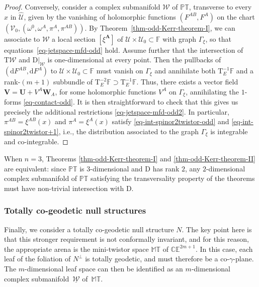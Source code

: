 \documentclass[pdftex]{sigma}
\numberwithin{equation}{section}
\newcommand{\mbf} [1]{\mathbf{#1}}
\newcommand{\mc} [1]{\mathcal{#1}}
\newcommand{\dd} {\mathrm{d}}
\newcommand{\Tgt} {\mathrm{T}}
\newcommand{\PT} {\mathbb{PT}}
\newcommand{\T} {\mathbb{T}}
\newcommand{\E} {\mathbb{E}}
\newcommand{\M} {\mathbb{M}}
\newcommand{\C} {\mathbb{C}}
\newcommand{\F} {\mathbb{F}}
\begin{document}
\begin{proof}
Conversely, consider a complex submanifold $\mc{W}$ of $\PT$, transverse to every $\hat{x}$ in $\widehat{\mc{U}}$, given by the vanishing of holomorphic functions $(F^{AB}, F^A)$ on the chart $(\mc{V}_0,(\omega^0, \omega^A, \pi^A, \pi^{AB}))$. By Theorem~\ref{thm-odd-Kerr-theorem-I}, we can associate to $\mc{W}$ a local section $[\xi^\mbf{A}]$ of $\mc{U} \times \mc{U}_0 \subset \F$ with graph $\Gamma_\xi$, so that equations~\eqref{eq-jetspace-mfd-odd} hold. Assume further that the intersection of $\Tgt \mc{W}$ and $\left. \mathrm{D} \right|_\mc{W}$ is one-dimensional at every point. Then the pullbacks of $( \dd F^{AB} , \dd F^{A} )$ to $\mc{U} \times \mc{U}_0 \subset \F$ must vanish on $\Gamma_\xi$ and annihilate both $\Tgt^{-1}_E \F$ and a rank-$(m+1)$ subbundle of $\Tgt^{-2}_E \F \supset \Tgt^{-1}_E \F$. Thus, there exists a vector f\/ield $\bm{V} = \bm{U} + V^A \bm{W}_A $, for some holomorphic functions $V^A$ on $\Gamma_\xi$, annihilating the $1$-forms \eqref{eq-contact-odd}. It is then straightforward to check that this gives us precisely the additional restrictions \eqref{eq-jetspace-mfd-odd2}. In particular, $\pi^{AB} = \xi^{AB}(x)$ and $\pi^{A} = \xi^A(x)$ satisfy \eqref{eq-int-spinor2twistor-odd} and \eqref{eq-int-spinor2twistor+1}, i.e., the distribution associated to the graph $\Gamma_{\xi}$ is integrable and co-integrable.
\end{proof}

\begin{Remark}\label{rem-fol-1}
When $n=3$, Theorems \ref{thm-odd-Kerr-theorem-I} and \ref{thm-odd-Kerr-theorem-II} are equivalent: since $\PT$ is $3$-dimensional and $\mathrm{D}$ has rank $2$, any $2$-dimensional complex submanifold of $\PT$ satisfying the transversality property of the theorems must have non-trivial intersection with $\mathrm{D}$.
\end{Remark}

\subsubsection{Totally co-geodetic null structures}
Finally, we consider a totally co-geodetic null structure $N$. The key point here is that this stronger requirement is not conformally invariant, and for this reason, the appropriate arena is the mini-twistor space $\M\T$ of $\C \E^{2m+1}$. In this case, each leaf of the foliation of $N^\perp$ is totally geodetic, and must therefore be a co-$\gamma$-plane. The $m$-dimensional leaf space can then be identif\/ied as an $m$-dimensional complex submanifold~$\underline{\mc{W}}$ of~$\M\T$.
\end{document}
